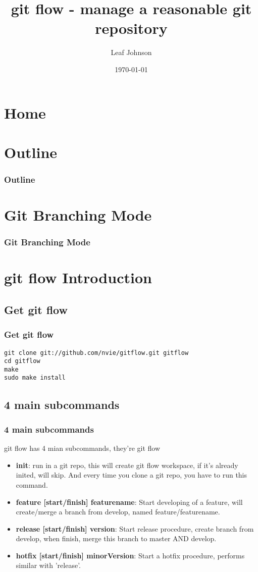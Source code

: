 \documentclass[compress, 11pt, serif]{beamer}
\title{git flow - manage a reasonable git repository}
\author[Leaf]{Leaf Johnson}
\institute{Elektrobit Wireless}
\date{\today}
\newcommand{\subcmd}{\textbf}
\begin{document}
\section{Home}
\maketitle

\section {Outline}
\begin{frame}
	\frametitle{Outline}
	\tableofcontents
\end{frame}

\section{Git Branching Mode}
\begin{frame}
\frametitle{Git Branching Mode}
\end{frame}

\section{git flow Introduction}
\subsection{Get git flow}
\begin{frame}[fragile]
\frametitle{Get git flow}
\begin{verbatim}
git clone git://github.com/nvie/gitflow.git gitflow
cd gitflow
make
sudo make install 
\end{verbatim}
\end{frame}

\subsection{4 main subcommands}
\begin{frame}
\frametitle{4 main subcommands}
git flow has 4 mian subcommands, they're git flow 
\begin{itemize}
	\item \subcmd{init}: run in a git repo, this will create git flow workspace, if it's already inited, will skip. And every time you clone a git repo, you have to run this command.
	\item \subcmd{feature [start/finish] featurename}: Start developing of a feature, will create/merge a branch from develop, named feature/featurename.
	\item \subcmd{release [start/finish] version}: Start release procedure, create branch from develop, when finish, merge this branch to master AND develop.
	\item \subcmd{hotfix [start/finish] minorVersion}: Start a hotfix procedure, performs similar with 'release'. 
\end{itemize}
\end{frame}
\end{document}
